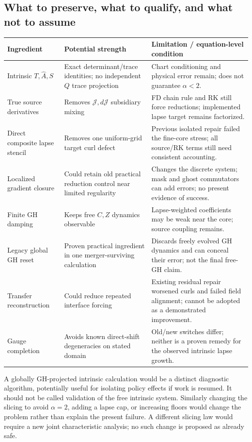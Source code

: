 \documentclass[11pt,letterpaper]{article}
\begin{document}
\subsection{What to preserve, what to qualify, and what not to assume}
\begin{longtable}{P{.24\linewidth}P{.31\linewidth}P{.37\linewidth}}
\toprule Ingredient & Potential strength & Limitation / equation-level condition\\\midrule
Intrinsic $T,\widehat A,S$ & Exact determinant/trace identities; no independent $Q$ trace projection & Chart conditioning and physical error remain; does not guarantee $\alpha<2$.\\
True source derivatives & Removes $\mathcal J,d\mathcal J$ subsidiary mixing & FD chain rule and RK still force reductions; implemented lapse target remains factorized.\\
Direct composite lapse stencil & Removes one uniform-grid target curl defect & Previous isolated repair failed the fine-core stress; all source/RK terms still need consistent accounting.\\
Localized gradient closure & Could retain old practical reduction control near limited regularity & Changes the discrete system; mask and ghost commutators can add errors; no present evidence of success.\\
Finite GH damping & Keeps free $C,Z$ dynamics observable & Lapse-weighted coefficients may be weak near the core; source coupling remains.\\
Legacy global GH reset & Proven practical ingredient in one merger-surviving calculation & Discards freely evolved GH dynamics and can conceal their error; not the final free-GH claim.\\
Transfer reconstruction & Could reduce repeated interface forcing & Existing residual repair worsened curls and failed field alignment; cannot be adopted as a demonstrated improvement.\\
Gauge completion & Avoids known direct-shift degeneracies on stated domain & Old/new switches differ; neither is a proven remedy for the observed intrinsic lapse growth.\\\bottomrule
\end{longtable}
A globally GH-projected intrinsic calculation would be a distinct diagnostic algorithm, potentially useful for isolating policy effects if work is resumed. It should not be called validation of the free intrinsic system. Similarly changing the slicing to avoid $\alpha=2$, adding a lapse cap, or increasing floors would change the problem rather than explain the present failure. A different slicing law would require a new joint characteristic analysis; no such change is proposed as already safe.
\end{document}
